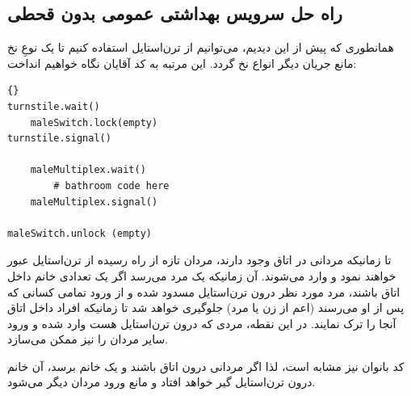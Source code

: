 \documentclass{book}
\begin{document}
\subsection{راه حل سرویس بهداشتی عمومی بدون قحطی}

    همانطوری که پیش از این دیدیم، می‌توانیم از ترن‌استایل استفاده کنیم تا یک نوعِ نخ‌ مانع جریان دیگر انواع نخ گردد. این مرتبه به کد آقایان نگاه خواهیم انداخت: 

\begin{latin}
\begin{lstlisting}[title=\rl{راه حل سرویس بهداشتی عمومی  بدون قحطی(آقایان)}]{}
turnstile.wait()
    maleSwitch.lock(empty)
turnstile.signal()

    maleMultiplex.wait()
        # bathroom code here
    maleMultiplex.signal()

maleSwitch.unlock (empty)
\end{lstlisting}
\end{latin}

    تا زمانیکه مردانی در اتاق وجود دارند، مردان تازه از راه رسیده از ترن‌استایل عبور خواهند نمود و وارد می‌شوند. آن زمانیکه یک مرد  می‌رسد اگر یک تعدادی خانم 
    داخل اتاق باشند، مرد مورد نظر درون ترن‌استایل مسدود شده و از ورود تمامی کسانی که پس از او می‌رسند (اعم از زن یا مرد) جلوگیری خواهد شد تا زمانیکه
    افراد داخل اتاق آنجا را ترک نمایند. در این نقطه، مردی که درون ترن‌استایل هست وارد شده و ورود سایر مردان را نیز ممکن می‌سازد. 

    کد بانوان نیز مشابه است، لذا اگر مردانی درون اتاق باشند و یک خانم برسد، آن خانم درون ترن‌استایل گیر خواهد افتاد و مانع ورود مردان دیگر می‌شود. 
\end{document}
